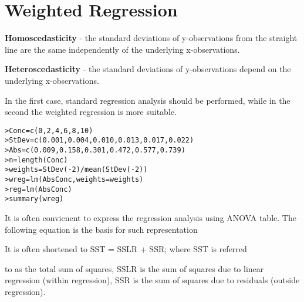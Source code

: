 
\section{Weighted Regression}

\textbf{Homoscedasticity} - the standard deviations of
y-observations from the straight line are the same independently
of the underlying x-observations.

\textbf{Heteroscedasticity} - the standard deviations of
y-observations depend on the underlying x-observations.

In the first case, standard regression analysis should be
performed, while in the second the weighted regression is more
suitable.

\begin{verbatim}
>Conc=c(0,2,4,6,8,10)
>StDev=c(0.001,0.004,0.010,0.013,0.017,0.022)
>Abs=c(0.009,0.158,0.301,0.472,0.577,0.739)
>n=length(Conc)
>weights=StDev(-2)/mean(StDev(-2))
>wreg=lm(AbsConc,weights=weights)
>reg=lm(AbsConc)
>summary(wreg)
\end{verbatim}


It is often convienent to express the regression analysis using
ANOVA table. The following equation is the basis for such
representation

It is often shortened to SST = SSLR + SSR; where SST is referred

to as the total sum of squares, SSLR is the sum of squares due to
linear regression (within regression), SSR is the sum of squares
due to residuals (outside regression).
